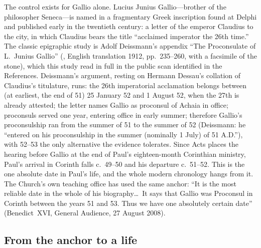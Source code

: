 The control exists for Gallio alone. Lucius Junius Gallio---brother of the
philosopher Seneca---is named in a fragmentary Greek inscription found at
Delphi and published early in the twentieth century: a letter of the
emperor Claudius to the city, in which Claudius bears the title
``acclaimed imperator the 26th time.'' The classic epigraphic study is
Adolf Deissmann's appendix ``The Proconsulate of L.~Junius Gallio''
(, English
translation 1912, pp.~235--260, with a facsimile of the stone), which this
study read in full in the public scan identified in the References.
Deissmann's argument, resting on Hermann Dessau's collation of Claudius's
titulature, runs: the 26th imperatorial acclamation belongs between
(at earliest, the end of 51) 25 January 52 and 1 August 52, when the 27th
is already attested; the letter names Gallio as proconsul of Achaia in
office; proconsuls served one year, entering office in early summer;
therefore Gallio's proconsulship ran from the summer of 51 to the summer
of 52 (Deissmann: he ``entered on his proconsulship in the summer
(nominally 1 July) of 51 A.D.''), with 52--53 the only alternative the
evidence tolerates. Since Acts places the hearing before Gallio at the end
of Paul's eighteen-month Corinthian ministry, Paul's arrival in Corinth
falls c.~49--50 and his departure c.~51--52. This is the one absolute
date in Paul's life, and the whole modern chronology hangs from it.
The Church's own teaching office has used the same anchor: ``It is the
most reliable date in the whole of his biography\ldots\ It says that
Gallio was Proconsul in Corinth between the years 51 and 53. Thus we have
one absolutely certain date'' (Benedict~XVI, General Audience, 27 August
2008).


\subsection{From the anchor to a life}

